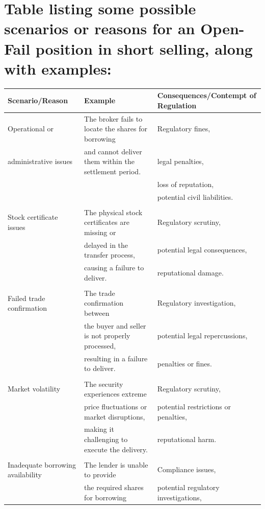 \documentclass[11pt]{article}
\begin{document}
\section{Table listing some possible scenarios or reasons for an Open-Fail position in short selling, along with examples:}
\label{sec:org267b1c5}

\begin{center}
\begin{tabular}{lll}
\hline
Scenario/Reason & Example & Consequences/Contempt of Regulation\\[0pt]
\hline
Operational or & The broker fails to locate the shares for borrowing & Regulatory fines,\\[0pt]
administrative issues & and cannot deliver them within the settlement period. & legal penalties,\\[0pt]
 &  & loss of reputation,\\[0pt]
 &  & potential civil liabilities.\\[0pt]
 &  & \\[0pt]
Stock certificate issues & The physical stock certificates are missing or & Regulatory scrutiny,\\[0pt]
 & delayed in the transfer process, & potential legal consequences,\\[0pt]
 & causing a failure to deliver. & reputational damage.\\[0pt]
 &  & \\[0pt]
Failed trade confirmation & The trade confirmation between & Regulatory investigation,\\[0pt]
 & the buyer and seller is not properly processed, & potential legal repercussions,\\[0pt]
 & resulting in a failure to deliver. & penalties or fines.\\[0pt]
 &  & \\[0pt]
Market volatility & The security experiences extreme & Regulatory scrutiny,\\[0pt]
 & price fluctuations or market disruptions, & potential restrictions or penalties,\\[0pt]
 & making it challenging to execute the delivery. & reputational harm.\\[0pt]
 &  & \\[0pt]
Inadequate borrowing availability & The lender is unable to provide & Compliance issues,\\[0pt]
 & the required shares for borrowing & potential regulatory investigations,\\[0pt]

\end{tabular}
\end{center}
\end{document}
